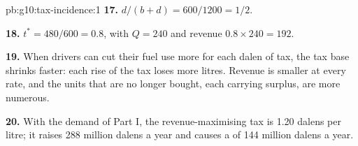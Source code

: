 \begin{solution}{pb:g10:tax-incidence:1}
\textbf{17.} $d/(b + d) = 600/1200 = 1/2$.

\textbf{18.} $t^* = 480/600 = 0.8$, with $Q = 240$ and revenue $0.8 \times 240 = 192$.

\textbf{19.} When drivers can cut their fuel use more for each dalen of tax, the tax base shrinks faster: each rise of the tax loses more litres. Revenue is smaller at every rate, and the units that
are no longer bought, each carrying surplus, are more numerous.

\textbf{20.} With the demand of Part I, the revenue-maximising tax is 1.20 dalens per litre; it raises 288 million dalens a year and causes a  of 144 million dalens a year.
\end{solution}
